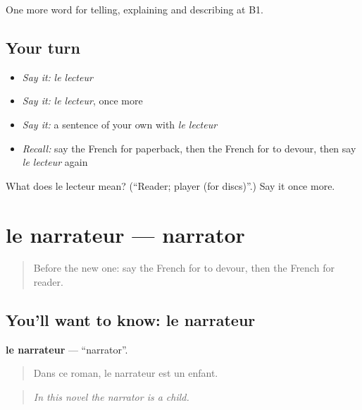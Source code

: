 \begin{grammarlens}[title={What you've built}]
One more word for telling, explaining and describing at B1.
\end{grammarlens}

\subsection*{Your turn}
\begin{itemize}
\raggedright
  \item \emph{Say it:} \emph{le lecteur}
  \item \emph{Say it:} \emph{le lecteur}, once more
  \item \emph{Say it:} a sentence of your own with \emph{le lecteur}
  \item \emph{Recall:} say the French for paperback, then the French for to devour, then say \emph{le lecteur} again
\end{itemize}

\begin{tcolorbox}[breakable,colback=teal!4,colframe=teal!35!black,title={Before you move on}]
What does le lecteur mean? (\textquotedblleft{}Reader; player (for discs)\textquotedblright{}.) Say it once more.
\end{tcolorbox}
\section[le narrateur]{le narrateur — narrator}

\label{lesson:FR-C521-narrateur}



\begin{quote}
Before the new one: say the French for to devour, then the French for reader.
\end{quote}

\subsection*{You'll want to know: le narrateur}
\textbf{le narrateur} — \textquotedblleft{}narrator\textquotedblright{}.

\begin{quote}
Dans ce roman, le narrateur est un enfant.
\end{quote}

\begin{quote}
\emph{In this novel the narrator is a child.}
\end{quote}

